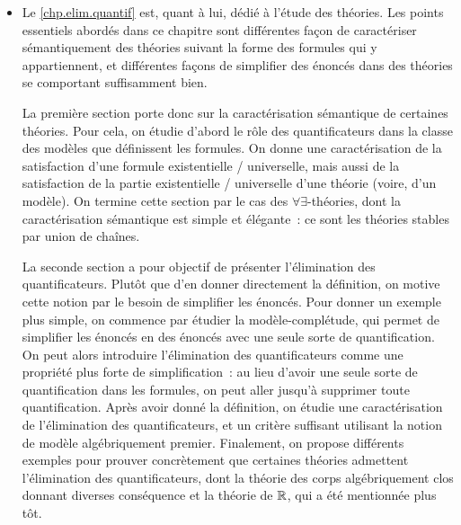 \begin{itemize}
  La seconde section du chapitre porte sur les parties définissables. On propose
  d'abord deux définitions équivalentes~: l'une en considérant des formules à
  paramètres et leur interprétation comme définissant des parties, l'autre
  comme une classe de parties des modèles inductivement construites par des
  opérations de base. On donne la première comme définition et la seconde comme
  caractérisation. La suite du chapitre passe en revue les propriétés
  incontournables à propos des parties définissables~: une extension élémentaire
  construit une extension canonique des parties définissable, et toute partie
  $\varPt$-définissable est stable par $\varPt$-automorphisme. On utilise la
  dernière propriété comme critère pour montrer sur des exemples que certaines
  parties ne sont pas définissables.

\item Le \cref{chp.elim.quantif} est, quant à lui, dédié à l'étude des théories.
  Les points essentiels abordés dans ce chapitre sont différentes façon de
  caractériser sémantiquement des théories suivant la forme des formules qui
  y appartiennent, et différentes façons de simplifier des énoncés dans des
  théories se comportant suffisamment bien.

  La première section porte donc sur la caractérisation sémantique de certaines
  théories. Pour cela, on étudie d'abord le rôle des quantificateurs dans la
  classe des modèles que définissent les formules. On donne une caractérisation
  de la satisfaction d'une formule existentielle / universelle, mais aussi de la
  satisfaction de la partie existentielle / universelle d'une théorie (voire,
  d'un modèle). On termine cette section par le cas des
  $\forall\exists$-théories, dont la caractérisation sémantique est simple et
  élégante~: ce sont les théories stables par union de chaînes.

  La seconde section a pour objectif de présenter l'élimination des
  quantificateurs. Plutôt que d'en donner directement la définition, on motive
  cette notion par le besoin de simplifier les énoncés. Pour donner un exemple
  plus simple, on commence par étudier la modèle-complétude, qui permet de
  simplifier les énoncés en des énoncés avec une seule sorte de quantification.
  On peut alors introduire l'élimination des quantificateurs comme une propriété
  plus forte de simplification~: au lieu d'avoir une seule sorte de
  quantification dans les formules, on peut aller jusqu'à supprimer toute
  quantification. Après avoir donné la définition, on étudie une caractérisation
  de l'élimination des quantificateurs, et un critère suffisant utilisant la
  notion de modèle algébriquement premier. Finalement, on propose différents
  exemples pour prouver concrètement que certaines théories admettent
  l'élimination des quantificateurs, dont la théorie des corps algébriquement
  clos donnant diverses conséquence et la théorie de $\mathbb R$, qui a été mentionnée
  plus tôt.


\end{itemize}
